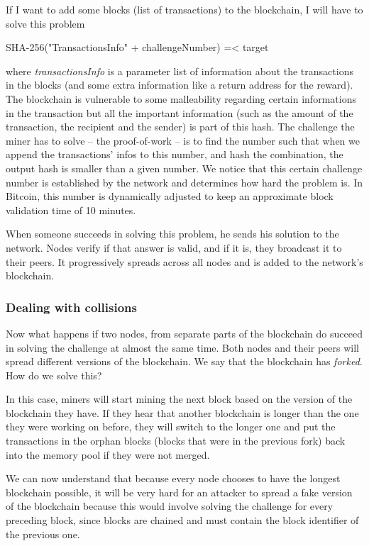 \documentclass{vldb}
\begin{document}
If I want to add some blocks (list of transactions) to the blockchain, I will have to solve this problem
\begin{center}
SHA-256("TransactionsInfo" + challengeNumber) =< target
\end{center}
where \emph{transactionsInfo} is a parameter list of information about the transactions in the blocks (and some extra information like a return address for the reward). The blockchain is vulnerable to some malleability regarding certain informations in the transaction but all the important information (such as the amount of the transaction, the recipient and the sender) is part of this hash.
The challenge the miner has to solve – the proof-of-work – is to find the number such that when we append the transactions' infos to this number, and hash the combination, the output hash is smaller than a given number.
We notice that this certain challenge number is established by the network and determines how hard the problem is. In Bitcoin, this number is dynamically adjusted to keep an approximate block validation time of 10 minutes.\cite{hashCash}

When someone succeeds in solving this problem, he sends his solution to the network. Nodes verify if that answer is valid, and if it is, they broadcast it to their peers. It progressively spreads across all nodes and is added to the network's blockchain. 

\subsubsection{Dealing with collisions}

Now what happens if two nodes, from separate parts of the blockchain do succeed in solving the challenge at almost the same time. Both nodes and their peers will spread different versions of the blockchain. We say that the blockchain has \emph{forked}. How do we solve this?

In this case, miners will start mining the next block based on the version of the blockchain they have. If they hear that another blockchain is longer than the one they were working on before, they will switch to the longer one and put the transactions in the orphan blocks (blocks that were in the previous fork) back into the memory pool if they were not merged. 

We can now understand that because every node chooses to have the longest blockchain possible, it will be very hard for an attacker to spread a fake version of the blockchain because this would involve solving the challenge for every preceding block, since blocks are chained and must contain the block identifier of the previous one. 
\end{document}
